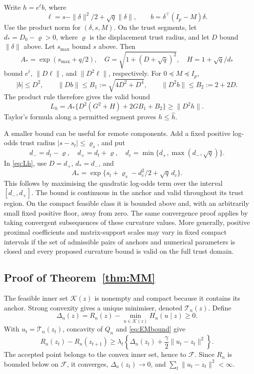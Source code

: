 \documentclass[12pt,a4paper]{article}
\theoremstyle{remark}
\begin{document}
Write $h=e^\ell b$, where
\[
 \ell=s-\|\delta\|^2/2+\sqrt q\|\delta\|,\qquad
 b=\delta^\top(I_p-M)\delta.
\]
Use the product norm for $(\delta,s,M)$. On the trust segments, let
$d_* =D_0-\varrho>0$, where $\varrho$ is the displacement trust radius, and let $D$ bound $\|\delta\|$ above. Let $s_{\max}$ bound $s$ above. Then
\[
 A_*=\exp(s_{\max}+q/2),\quad
 G=\sqrt{1+(D+\sqrt q)^2},\quad H=1+\sqrt q/d_*
\]
bound $e^\ell$, $\|D\ell\|$, and $\|D^2\ell\|$, respectively. For $0\preceq M\preceq I_p$,
\[
 |b|\le D^2,\qquad
 \|Db\|\le B_1:=\sqrt{4D^2+D^4},\qquad
 \|D^2b\|\le B_2:=2+2D.
\]
The product rule therefore gives the valid bound
\begin{equation}\label{eq:Lh}
 L_h=A_*\{D^2(G^2+H)+2GB_1+B_2\}
 \ge\|D^2h\|.
\end{equation}
Taylor's formula along a permitted segment proves $h\le\widehat h$.

A smaller bound can be useful for remote components. Add a fixed positive log-odds trust radius $|s-s_t|\le\varrho_s$, and put
\[
 d_-=d_t-\varrho,\quad d_+=d_t+\varrho,\quad
 d_c=\min\{d_+,\max(d_-,\sqrt q)\}.
\]
In \eqref{eq:Lh}, use $D=d_+$, $d_*=d_-$, and
\[
 A_*=\exp\{s_t+\varrho_s-d_c^2/2+\sqrt q\,d_c\}.
\]
This follows by maximising the quadratic log-odds term over the interval $[d_-,d_+]$. The bound is continuous in the anchor and valid throughout its trust region. On the compact feasible class it is bounded above and, with an arbitrarily small fixed positive floor, away from zero. The same convergence proof applies by taking convergent subsequences of these curvature values. More generally, positive proximal coefficients and matrix-support scales may vary in fixed compact intervals if the set of admissible pairs of anchors and numerical parameters is closed and every proposed curvature bound is valid on the full trust domain.

\subsection{Proof of Theorem~\ref{thm:MM}}

The feasible inner set $\mathcal K(z)$ is nonempty and compact because it contains its anchor. Strong convexity gives a unique minimiser, denoted $\mathcal T_n(z)$. Define
\[
 \Delta_n(z)=R_n(z)-\min_{u\in\mathcal K(z)}H_n(u\mid z)\ge0.
\]
With $u_t=\mathcal T_n(z_t)$, concavity of $Q_n$ and \eqref{eq:EMbound} give
\begin{equation}\label{eq:suffdecrease}
 R_n(z_t)-R_n(z_{t+1})
 \ge\lambda_t\left\{\Delta_n(z_t)+
                         \frac\gamma2\|u_t-z_t\|^2\right\}.
\end{equation}
The accepted point belongs to the convex inner set, hence to $\mathcal F$. Since $R_n$ is bounded below on $\mathcal F$, it converges,
$\Delta_n(z_t)\to0$, and $\sum_t\|u_t-z_t\|^2<\infty$.
\end{document}

